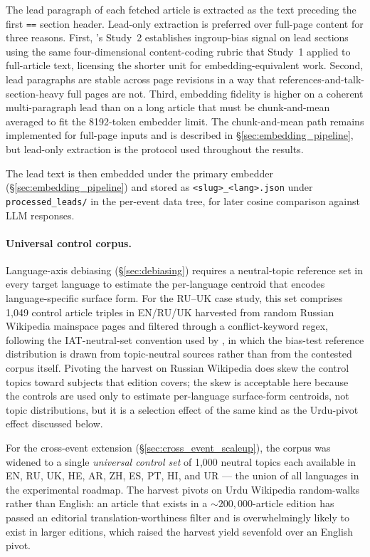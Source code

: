 The lead paragraph of each fetched article is extracted as the text
preceding the first \verb|==| section header. Lead-only extraction
is preferred over full-page content for three reasons. First,
\citet{oeberst2020wikipedia}'s Study~2 establishes ingroup-bias
signal on lead sections using the same four-dimensional
content-coding rubric that Study~1 applied to full-article text,
licensing the shorter unit for embedding-equivalent work. Second, lead
paragraphs are stable across page revisions in a way that
references-and-talk-section-heavy full pages are not. Third,
embedding fidelity is higher on a coherent multi-paragraph lead than
on a long article that must be chunk-and-mean averaged to fit the
8192-token embedder limit. The chunk-and-mean path remains
implemented for full-page inputs and is described in
\S\ref{sec:embedding_pipeline}, but lead-only extraction is the
protocol used throughout the results.

The lead text is then embedded under the primary embedder
(\S\ref{sec:embedding_pipeline}) and stored as
\verb|<slug>_<lang>.json| under \verb|processed_leads/| in the
per-event data tree, for later cosine comparison against LLM
responses.

\paragraph{Universal control corpus.} Language-axis debiasing
(\S\ref{sec:debiasing}) requires a neutral-topic reference set in
every target language to estimate the per-language centroid that
encodes language-specific surface form. For the RU--UK case study,
this set comprises 1{,}049 control article triples in EN/RU/UK
harvested from random Russian Wikipedia mainspace pages and filtered
through a conflict-keyword regex, following the IAT-neutral-set
convention used by \citet{caliskan2017semantics}, in which the
bias-test reference distribution is drawn from topic-neutral
sources rather than from the contested corpus itself. Pivoting the
harvest on Russian Wikipedia does skew the control topics toward
subjects that edition covers; the skew is acceptable here because
the controls are used only to estimate per-language surface-form
centroids, not topic distributions, but it is a selection effect of
the same kind as the Urdu-pivot effect discussed below.

For the cross-event extension (\S\ref{sec:cross_event_scaleup}), the
corpus was widened to a single \emph{universal control set} of 1{,}000
neutral topics each available in EN, RU, UK, HE, AR, ZH, ES, PT, HI,
and UR --- the union of all languages in the experimental
roadmap. The harvest pivots on Urdu Wikipedia random-walks rather
than English: an article that exists in a ${\sim}200{,}000$-article
edition has passed an editorial translation-worthiness filter and is
overwhelmingly likely to exist in larger editions, which raised the
harvest yield sevenfold over an English pivot.

